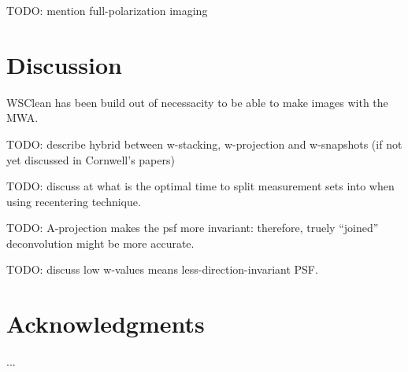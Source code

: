 \documentclass[useAMS,usenatbib]{mn2e}
\DeclareRobustCommand{\TUSSEN}[3]{#2}
\begin{document}
TODO: mention full-polarization imaging


\section{Discussion} \label{sec:discussion}
WSClean has been build out of necessacity to be able to make images with the MWA. 

TODO: describe hybrid between w-stacking, w-projection and w-snapshots (if not yet discussed in Cornwell's papers)

TODO: discuss at what is the optimal time to split measurement sets into when using recentering technique.

TODO: A-projection makes the psf more invariant: therefore, truely ``joined'' deconvolution might be more accurate.

TODO: discuss low w-values means less-direction-invariant PSF.

\section*{Acknowledgments}
...

\DeclareRobustCommand{\TUSSEN}[3]{#3}




\label{lastpage}
\end{document}
